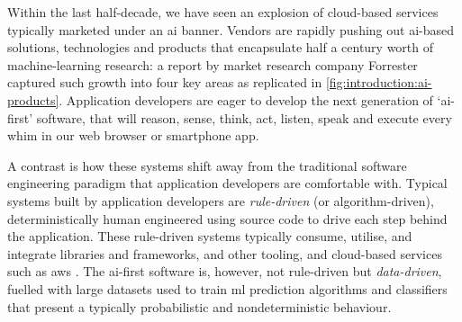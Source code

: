 \label{sec:introduction:preface}

Within the last half-decade, we have seen an explosion of cloud-based services typically marketed under an \gls{ai} banner. 
Vendors are rapidly pushing out \gls{ai}-based solutions, technologies and products that encapsulate half a century worth of machine-learning research: a \citeyear{LoGiudice:2016wf} report by market research company Forrester captured such growth into four key areas \citep{LoGiudice:2016wf} as replicated in  \cref{fig:introduction:ai-products}. 
Application developers are eager to develop the next generation of `\gls{ai}-first' software, that will reason, sense, think, act, listen, speak and execute every whim in our web browser or smartphone app.

A contrast is how these systems shift away from the traditional software engineering paradigm that application developers are comfortable with. Typical systems built by application developers are \textit{rule-driven} (or algorithm-driven), deterministically human engineered using source code to drive each step behind the application. These rule-driven systems typically consume, utilise, and integrate libraries and frameworks,  and other tooling, and cloud-based services such as \gls{aws} \citep{AWS:Home}. The \gls{ai}-first software is, however, not rule-driven but \textit{data-driven}, fuelled with large datasets used to train \gls{ml} prediction algorithms and classifiers that present a typically probabilistic and nondeterministic behaviour.

